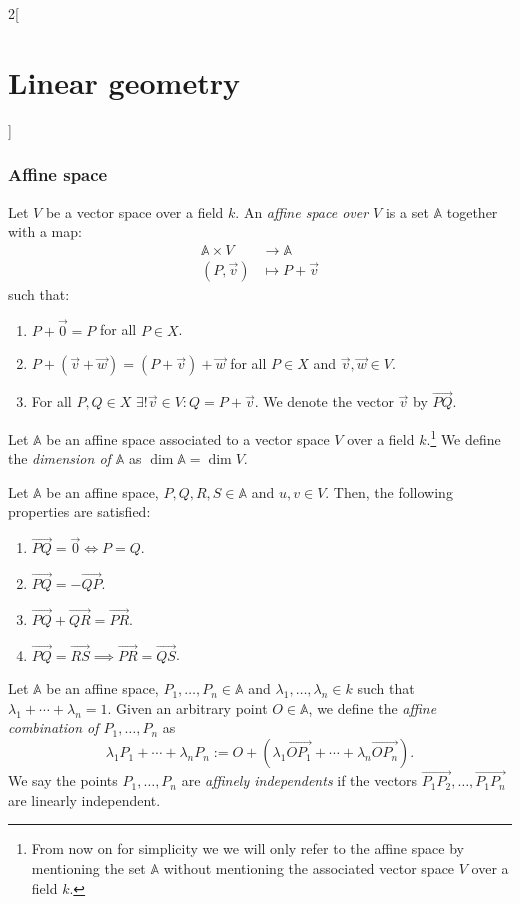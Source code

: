 \documentclass[class=article,10pt,crop=false]{standalone}
\begin{document}
\begin{multicols}{2}[\section{Linear geometry}]
\subsubsection{Affine space}
\begin{definition}
Let $V$ be a vector space over a field $k$. An \textit{affine space over $V$} is a set $\mathbb{A}$ together with a map:
\begin{align*}
    \mathbb{A}\times V&\rightarrow \mathbb{A}\\
    (P,\vec{v})&\mapsto P+\vec{v}
\end{align*}
such that:
\begin{enumerate}
    \item $P+\vec{0}=P$ for all $P\in X$.
    \item $P+(\vec{v}+\vec{w})=(P+\vec{v})+\vec{w}$ for all $P\in X$ and $\vec{v},\vec{w}\in V$.
    \item For all $P,Q\in X$ $\exists!\vec{v}\in V:Q=P+\vec{v}$. We denote the vector $\vec{v}$ by $\overrightarrow{PQ}$.
\end{enumerate}
\end{definition}
\begin{definition}
Let $\mathbb{A}$ be an affine space associated to a vector space $V$ over a field $k$.\footnote{From now on for simplicity we we will only refer to the affine space by mentioning the set $\mathbb{A}$ without mentioning the associated vector space $V$ over a field $k$.} We define the \textit{dimension of $\mathbb{A}$} as $\dim\mathbb{A}=\dim V$.
\end{definition}
\begin{prop}
Let $\mathbb{A}$ be an affine space, $P,Q,R,S\in\mathbb{A}$ and $u,v\in V$. Then, the following properties are satisfied:
\begin{enumerate}
    \item $\overrightarrow{PQ}=\overrightarrow{0}\iff P=Q$.
    \item $\overrightarrow{PQ}=-\overrightarrow{QP}$.
    \item $\overrightarrow{PQ}+\overrightarrow{QR}=\overrightarrow{PR}$.
    \item $\overrightarrow{PQ}=\overrightarrow{RS}\implies\overrightarrow{PR}=\overrightarrow{QS}$.
\end{enumerate}
\end{prop}
\begin{definition}
Let $\mathbb{A}$ be an affine space, $P_1,\ldots,P_n\in\mathbb{A}$ and $\lambda_1,\ldots,\lambda_n\in k$ such that $\lambda_1+\cdots+\lambda_n=1$. Given an arbitrary point $O\in\mathbb{A}$, we define the \textit{affine combination of $P_1,\ldots,P_n$} as $$\lambda_1P_1+\cdots+\lambda_nP_n:=O+\left(\lambda_1\overrightarrow{OP_1}+\cdots+\lambda_n\overrightarrow{OP_n}\right).$$ We say the points $P_1,\ldots,P_n$ are \textit{affinely independents} if the vectors $\overrightarrow{P_1P_2},\ldots,\overrightarrow{P_1P_n}$ are linearly independent.

\end{definition}
\end{multicols}
\end{document}
